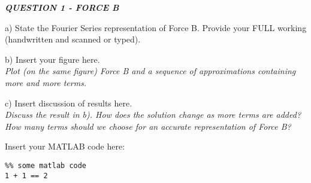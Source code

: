 \begin{tcolorbox}[colback=gray!50,enhanced,sharp corners,frame hidden,halign=left]
    \textbf{\textit{QUESTION 1 - FORCE B}}
\end{tcolorbox}

a) State the Fourier Series representation of Force B. Provide your FULL working (handwritten and scanned or typed).
\begin{flushright}
    [10 Marks*]
\end{flushright}







\noindent\makebox[\linewidth]{\rule{\linewidth}{0.4pt}}
b) Insert your figure here. \\
\textit{Plot (on the same figure) Force B and a sequence of approximations containing more and more terms.}
\begin{flushright}
\end{flushright}









\noindent\makebox[\linewidth]{\rule{\linewidth}{0.4pt}}
c) Insert discussion of results here. \\
\textit{Discuss the result in b). How does the solution change as more terms are added? How many terms should we choose for an accurate representation of Force B?}
\begin{flushright}
\end{flushright}




\noindent\makebox[\linewidth]{\rule{\linewidth}{0.4pt}}
Insert your MATLAB code here:

\begin{lstlisting}
%% some matlab code
1 + 1 == 2
\end{lstlisting}


\clearpage
